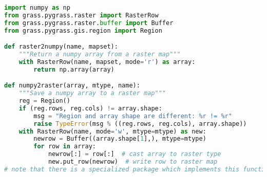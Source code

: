 \documentclass{standalone}
\begin{document}
\begin{lstlisting}[language=Python,linewidth=44.2em]
import numpy as np
from grass.pygrass.raster import RasterRow
from grass.pygrass.raster.buffer import Buffer
from grass.pygrass.gis.region import Region

def raster2numpy(name, mapset):
    """Return a numpy array from a raster map"""
    with RasterRow(name, mapset, mode='r') as array:
        return np.array(array)

def numpy2raster(array, mtype, name):
    """Save a numpy array to a raster map"""
    reg = Region()
    if (reg.rows, reg.cols) != array.shape:
        msg = "Region and array shape are different: %r != %r"
        raise TypeError(msg % ((reg.rows, reg.cols), array.shape))
    with RasterRow(name, mode='w', mtype=mtype) as new:
        newrow = Buffer((array.shape[1],), mtype=mtype)
        for row in array:
            newrow[:] = row[:]  # cast array to raster type
            new.put_row(newrow)  # write row to raster map
# note that there is a specialized package which implements this functionality
\end{lstlisting}
\end{document}
